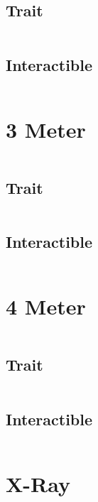 \documentclass[main.tex]{subfiles}
\begin{document}
\begin{lstlisting}[language=FG]
\end{lstlisting}

\subsection{Trait}

\begin{lstlisting}[language=FG]
\end{lstlisting}


\subsection{Interactible}
\begin{lstlisting}[language=FG]

\end{lstlisting}

\section{3 Meter}


\begin{lstlisting}[language=FG]
\end{lstlisting}

\subsection{Trait}

\begin{lstlisting}[language=FG]
\end{lstlisting}


\subsection{Interactible}
\begin{lstlisting}[language=FG]

\end{lstlisting}
\section{4 Meter}

\begin{lstlisting}[language=FG]
\end{lstlisting}

\subsection{Trait}

\begin{lstlisting}[language=FG]
\end{lstlisting}


\subsection{Interactible}
\begin{lstlisting}[language=FG]

\end{lstlisting}

\section{X-Ray}
\end{document}

